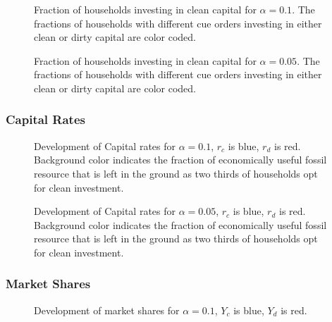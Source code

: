 \begin{figure}[t]
	\centering
	\caption{Fraction of households investing in clean capital for $\alpha=0.1$. The fractions of households with different cue orders investing in either clean or dirty capital are color coded.}
	\label{5o2_1}
\end{figure}
\begin{figure}[t]
	\centering
	\caption{Fraction of households investing in clean capital for $\alpha=0.05$. The fractions of households with different cue orders investing in either clean or dirty capital are color coded.}
	\label{5o2_2}
\end{figure}
\subsubsection{Capital Rates}
\begin{figure}[t]
	\centering
	\caption{Development of Capital rates for $\alpha=0.1$, $r_c$ is blue, $r_d$ is red. Background color indicates the fraction of economically useful fossil resource that is left in the ground as two thirds of households opt for clean investment.}

\end{figure}

\begin{figure}[t]
	\centering
	\caption{Development of Capital rates for $\alpha=0.05$, $r_c$ is blue, $r_d$ is red. Background color indicates the fraction of economically useful fossil resource that is left in the ground as two thirds of households opt for clean investment.}

\end{figure}
\subsubsection{Market Shares}
\begin{figure}[t]
	\centering
	\caption{Development of market shares for $\alpha=0.1$, $Y_c$ is blue, $Y_d$ is red.}

\end{figure}


